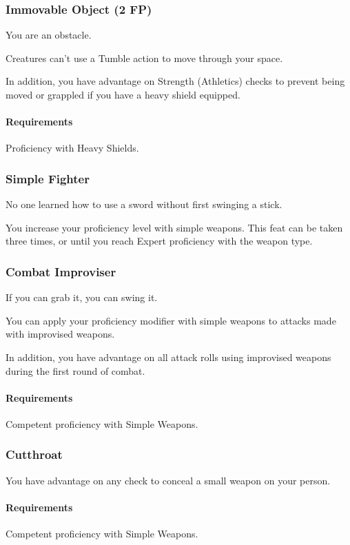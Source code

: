 \subsubsection{Immovable Object (2 FP)} \label{feat::immovableobject}
    You are an obstacle.

    Creatures can't use a Tumble action to move through your space.

    In addition, you have advantage on Strength (Athletics) checks to prevent being moved or grappled if you have a heavy shield equipped.
    \paragraph{Requirements} Proficiency with Heavy Shields.

\subsubsection{Simple Fighter} \label{feat::simplefighter}
    No one learned how to use a sword without first swinging a stick.

    You increase your proficiency level with simple weapons.
    This feat can be taken three times, or until you reach Expert proficiency with the weapon type.
\subsubsection{Combat Improviser} \label{feat::combatimproviser}
    If you can grab it, you can swing it.

    You can apply your proficiency modifier with simple weapons to attacks made with improvised weapons.

    In addition, you have advantage on all attack rolls using improvised weapons during the first round of combat.
    \paragraph{Requirements} Competent proficiency with Simple Weapons.
\subsubsection{Cutthroat} \label{feat::cutthroat}
    You have advantage on any check to conceal a small weapon on your person.
    \paragraph{Requirements} Competent proficiency with Simple Weapons.
